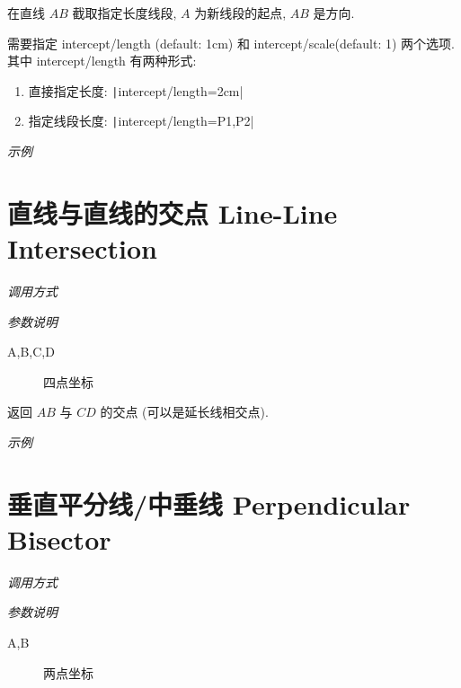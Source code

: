 在直线 $AB$ 截取指定长度线段, $A$ 为新线段的起点, $AB$ 是方向.

需要指定 intercept/length (default: 1cm) 和 intercept/scale(default: 1) 两个选项.
其中 intercept/length 有两种形式:

\begin{enumerate}
  \item 直接指定长度: \texttt|intercept/length=2cm|
  \item 指定线段长度: \texttt|intercept/length={P1,P2}|
\end{enumerate}

\emph{示例}



\section{直线与直线的交点 Line-Line Intersection}

\emph{调用方式}

\begin{tcolorbox}{}
\end{tcolorbox}

\emph{参数说明}

\begin{description}
  \item[A,B,C,D] 四点坐标 
\end{description}

返回 $AB$ 与 $CD$ 的交点 (可以是延长线相交点).

\emph{示例}


\section{垂直平分线/中垂线 Perpendicular Bisector}

\emph{调用方式}

\begin{tcolorbox}{}
\end{tcolorbox}

\emph{参数说明}

\begin{description}
  \item[A,B] 两点坐标 
\end{description}

